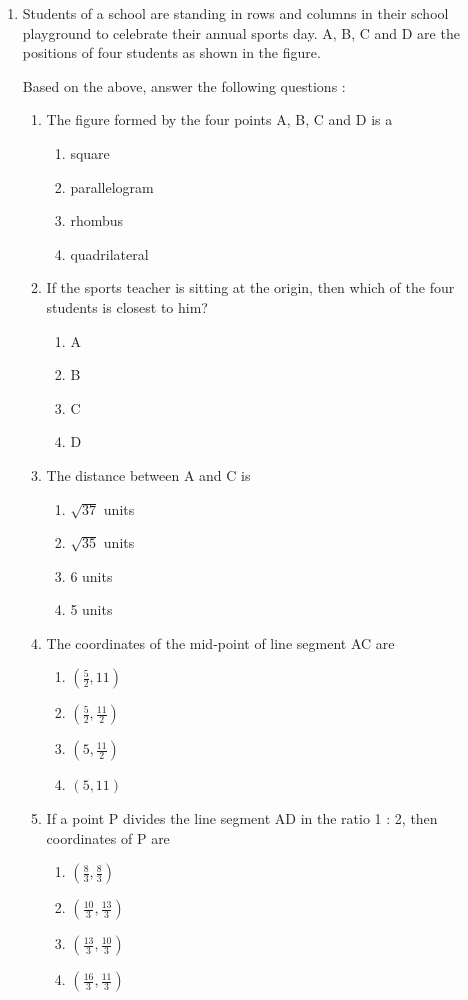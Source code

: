 \documentclass{article}
\begin{document}
\begin{enumerate}
\item Students of a school are standing in rows and columns in their school playground to celebrate their annual sports day. A, B, C and D are the positions of four students as shown in the figure.
	\begin{center}
	
	\end{center}
Based on the above, answer the following questions : 	
\begin{enumerate}
\item  The figure formed by the four points A, B, C and D is a 
	\begin{enumerate}
	\item  square 
	\item  parallelogram
	\item  rhombus 
	\item  quadrilateral 
	\end{enumerate}
\item If the sports teacher is sitting at the origin, then which of the four students is closest to him? 
	\begin{enumerate}
	\item  A
	\item  B
	\item  C
	\item  D
	\end{enumerate}
\item The distance between A and C is
	\begin{enumerate}
	\item $\sqrt{37}$ units
	\item $\sqrt{35}$ units
	\item 6 units
	\item 5 units
	\end{enumerate}
\item The coordinates of the mid-point of line segment AC are
	\begin{enumerate}
	\item $(\frac{5}{2},11)$
	\item $(\frac{5}{2},\frac{11}{2})$
	\item $(5,\frac{11}{2})$
	\item $(5,11)$
	\end{enumerate}
\item If a point P divides the line segment AD in the ratio 1 : 2, then coordinates of P are
	\begin{enumerate}
	\item $(\frac{8}{3},\frac{8}{3})$
	\item $(\frac{10}{3},\frac{13}{3})$
	\item $(\frac{13}{3},\frac{10}{3})$
	\item $(\frac{16}{3},\frac{11}{3})$
	\end{enumerate}
\end{enumerate}
		

\end{enumerate}
\end{document}
